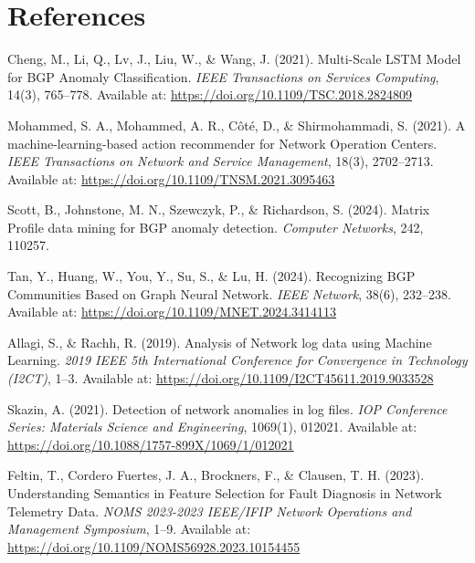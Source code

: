 \documentclass[11pt]{article}
\begin{document}
\section{References}

\begin{thebibliography}{9}

Cheng, M., Li, Q., Lv, J., Liu, W., \& Wang, J. (2021).
Multi-Scale LSTM Model for BGP Anomaly Classification.
\textit{IEEE Transactions on Services Computing}, 14(3), 765--778.
Available at: \href{https://doi.org/10.1109/TSC.2018.2824809}{https://doi.org/10.1109/TSC.2018.2824809}

Mohammed, S. A., Mohammed, A. R., Côté, D., \& Shirmohammadi, S. (2021).
A machine-learning-based action recommender for Network Operation Centers.
\textit{IEEE Transactions on Network and Service Management}, 18(3), 2702--2713.
Available at: \href{https://doi.org/10.1109/TNSM.2021.3095463}{https://doi.org/10.1109/TNSM.2021.3095463}

Scott, B., Johnstone, M. N., Szewczyk, P., \& Richardson, S. (2024).
Matrix Profile data mining for BGP anomaly detection.
\textit{Computer Networks}, 242, 110257.

Tan, Y., Huang, W., You, Y., Su, S., \& Lu, H. (2024).
Recognizing BGP Communities Based on Graph Neural Network.
\textit{IEEE Network}, 38(6), 232--238.
Available at: \href{https://doi.org/10.1109/MNET.2024.3414113}{https://doi.org/10.1109/MNET.2024.3414113}

Allagi, S., \& Rachh, R. (2019).
Analysis of Network log data using Machine Learning.
\textit{2019 IEEE 5th International Conference for Convergence in Technology (I2CT)}, 1--3.
Available at: \href{https://doi.org/10.1109/I2CT45611.2019.9033528}{https://doi.org/10.1109/I2CT45611.2019.9033528}

Skazin, A. (2021).
Detection of network anomalies in log files.
\textit{IOP Conference Series: Materials Science and Engineering}, 1069(1), 012021.
Available at: \href{https://doi.org/10.1088/1757-899X/1069/1/012021}{https://doi.org/10.1088/1757-899X/1069/1/012021}

Feltin, T., Cordero Fuertes, J. A., Brockners, F., \& Clausen, T. H. (2023).
Understanding Semantics in Feature Selection for Fault Diagnosis in Network Telemetry Data.
\textit{NOMS 2023-2023 IEEE/IFIP Network Operations and Management Symposium}, 1--9.
Available at: \href{https://doi.org/10.1109/NOMS56928.2023.10154455}{https://doi.org/10.1109/NOMS56928.2023.10154455}


\end{thebibliography}
\end{document}
